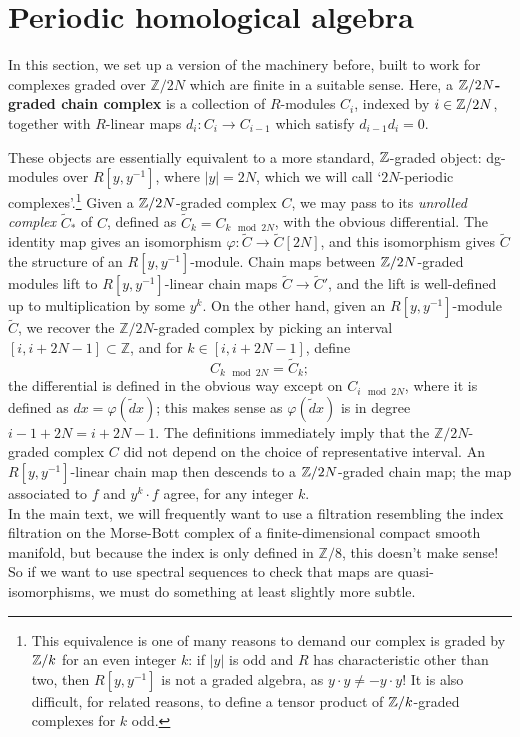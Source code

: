 \documentclass{memo-l}
\theoremstyle{definition}
\theoremstyle{remark}
\numberwithin{section}{chapter}
\numberwithin{equation}{chapter}
\begin{document}
\section{Periodic homological algebra}\label{PeriodicMachine}
In this section, we set up a version of the machinery before, built to work for complexes graded over $\mathbb Z/2N$ which are finite in a suitable sense. Here, a \textbf{$\Bbb Z/2N$-graded chain complex} is a collection of $R$-modules $C_i$, indexed by $i \in \Bbb Z/2N$, together with $R$-linear maps $d_i: C_i \to C_{i-1}$ which satisfy $d_{i-1} d_i = 0$. 

These objects are essentially equivalent to a more standard, $\Bbb Z$-graded object: dg-modules over $R[y, y^{-1}]$, where $|y| = 2N$, which we will call `$2N$-periodic complexes'.\footnote{This equivalence is one of many reasons to demand our complex is graded by $\Bbb Z/k$ for an even integer $k$: if $|y|$ is odd and $R$ has characteristic other than two, then $R[y, y^{-1}]$ is not a graded algebra, as $y \cdot y \ne - y \cdot y$! It is also difficult, for related reasons, to define a tensor product of $\Bbb Z/k$-graded complexes for $k$ odd.} Given a $\Bbb Z/2N$-graded complex $C$, we may pass to its \textit{unrolled complex} $\widetilde C_*$ of $C$, defined as $\widetilde C_k = C_{k \!\!\! \mod 2N}$, with the obvious differential. The identity map gives an isomorphism $\varphi: \widetilde C \to \widetilde C[2N]$, and this isomorphism gives $\widetilde C$ the structure of an $R[y, y^{-1}]$-module. Chain maps between $\Bbb Z/2N$-graded modules lift to $R[y, y^{-1}]$-linear chain maps $\widetilde C \to \widetilde C'$, and the lift is well-defined up to multiplication by some $y^k$. On the other hand, given an $R[y, y^{-1}]$-module $\widetilde C$,  we recover the $\mathbb Z/2N$-graded complex by picking an interval $[i,i+2N-1] \subset \mathbb Z$, and for $k \in [i, i+2N-1]$, define $$C_{k \!\!\! \mod 2N} = \widetilde C_k;$$ the differential is defined in the obvious way except on $C_{i\!\!\!\mod 2N}$, where it is defined as $dx = \varphi(\widetilde d x)$; this makes sense as $\varphi(\widetilde dx)$ is in degree $i-1+2N = i+2N-1$. The definitions immediately imply that the $\mathbb Z/2N$-graded complex $C$ did not depend on the choice of representative interval. An $R[y,y^{-1}]$-linear chain map then descends to a $\Bbb Z/2N$-graded chain map; the map associated to $f$ and $y^k \cdot f$ agree, for any integer $k$.\\

In the main text, we will frequently want to use a filtration resembling the index filtration on the Morse-Bott complex of a finite-dimensional compact smooth manifold, but because the index is only defined in $\mathbb Z/8$, this doesn't make sense! So if we want to use spectral sequences to check that maps are quasi-isomorphisms, we must do something at least slightly more subtle.
\end{document}
